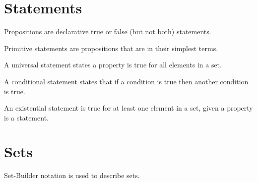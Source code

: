 
\section{Statements}

\begin{definition}[props]\label{def:props}
Propositions are declarative true or false (but not both) statements.
\end{definition}

\begin{definition}[prims]\label{def:prims}
Primitive statements are propositions that are in their simplest terms.
\end{definition}

\begin{definition}\label{def:universal-stmts}
A universal statement states a property is true for all elements in a set.
\end{definition}

\begin{definition}\label{def:cond-stmts}
A conditional statement states that if a condition is true then another condition is true.
\end{definition}

\begin{definition}\label{def:exist-stmts}
An existential statement is true for at least one element in a set, given a property is a statement.
\end{definition}

\section{Sets}

Set-Builder notation is used to describe sets.




